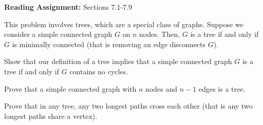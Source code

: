 \documentclass[12pt,twoside]{article}
\begin{document}
\noindent \textbf{Reading Assignment:}   Sections 7.1-7.9
\\


\begin{problem}{20}

	This problem involves trees, which are a special class of graphs.  Suppose we consider a simple connected graph $G$ on $n$ nodes.  Then, $G$ is a tree if and only if $G$ is minimally connected (that is removing an edge disconnects $G$).

    \bparts
    
     Show that our definition of a tree implies that a simple connected graph $G$ is a tree if and only if $G$ contains no cycles.

     Prove that a simple connected graph with $n$ nodes and $n-1$ edges is a tree.

    
     Prove that in any tree, any two longest paths cross each other (that is any two longest paths share a vertex).  

\eparts
\end{problem}
\end{document}
